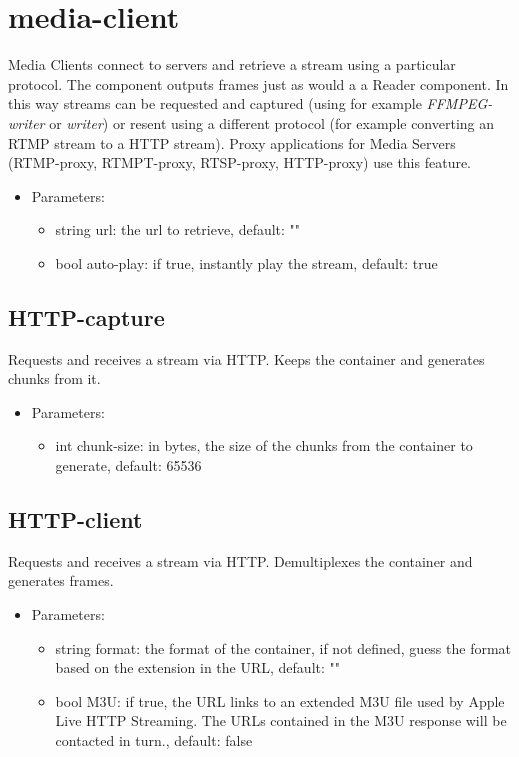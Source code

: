 \section{media-client}
Media Clients connect to servers and retrieve a stream using a particular protocol. The component outputs frames just as would a a Reader component. In this way streams can be requested and captured (using for example \textit{FFMPEG-writer} or \textit{writer}) or resent using a different protocol (for example converting an RTMP stream to a HTTP stream). Proxy applications for Media Servers (RTMP-proxy, RTMPT-proxy, RTSP-proxy, HTTP-proxy) use this feature.
\begin{itemize}
\item Parameters:
\begin{itemize}
\item string url: the url to retrieve, default: ""
\item bool auto-play: if true, instantly play the stream, default: true
\end{itemize}
\end{itemize}
\subsection{HTTP-capture}
Requests and receives a stream via HTTP. Keeps the container and generates chunks from it.
\begin{itemize}
\item Parameters:
\begin{itemize}
\item int chunk-size: in bytes, the size of the chunks from the container to generate, default: 65536
\end{itemize}
\end{itemize}
\subsection{HTTP-client}
Requests and receives a stream via HTTP. Demultiplexes the container and generates frames.
\begin{itemize}
\item Parameters:
\begin{itemize}
\item string format: the format of the container, if not defined, guess the format based on the extension in the URL, default: ""
\item bool M3U: if true, the URL links to an extended M3U file used by Apple Live HTTP Streaming. The URLs contained in the M3U response will be contacted in turn., default: false
\end{itemize}
\end{itemize}
